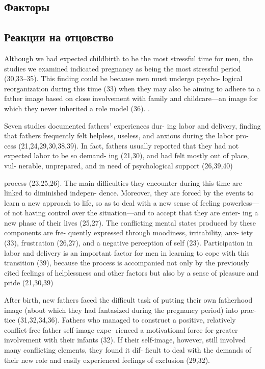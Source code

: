 \documentclass{../../common/thesisbyxetex}
\begin{document}





\subsection{Факторы}





 
\subsection{Реакции на отцовство}

Although we had expected childbirth to be the most
stressful time for men, the studies we examined indicated
pregnancy as being the most stressful period (30,33–35).
This finding could be because men must undergo psycho-
logical reorganization during this time (33) when they
may also be aiming to adhere to a father image based
on close involvement with family and childcare—an
image for which they never inherited a role model (36).
 \cite[313]{flit}.


 Seven studies documented fathers’ experiences dur-
ing labor and delivery, finding that fathers frequently
felt helpless, useless, and anxious during the labor pro-
cess (21,24,29,30,38,39). In fact, fathers usually reported
that they had not expected labor to be so demand-
ing (21,30), and had felt mostly out of place, vul-
nerable, unprepared, and in need of psychological
support (26,39,40)\cite[313]{flit}


process (23,25,26). The main difficulties they encounter
during this time are linked to diminished indepen-
dence. Moreover, they are forced by the events to
learn a new approach to life, so as to deal with a
new sense of feeling powerless—of not having control
over the situation—and to accept that they are enter-
ing a new phase of their lives (25,27). The conflicting
mental states produced by these components are fre-
quently expressed through moodiness, irritability, anx-
iety (33), frustration (26,27), and a negative perception
of self (23). Participation in labor and delivery is an
important factor for men in learning to cope with this
transition (39), because the process is accompanied not
only by the previously cited feelings of helplessness
and other factors but also by a sense of pleasure and
pride (21,30,39) \cite[314]{flit}


After birth, new fathers faced the difficult task of
putting their own fatherhood image (about which they
had fantasized during the pregnancy period) into prac-
tice (31,32,34,36). Fathers who managed to construct a
positive, relatively conflict-free father self-image expe-
rienced a motivational force for greater involvement
with their infants (32). If their self-image, however, still
involved many conflicting elements, they found it dif-
ficult to deal with the demands of their new role and
easily experienced feelings of exclusion (29,32).\cite[314]{flit}
\end{document}
